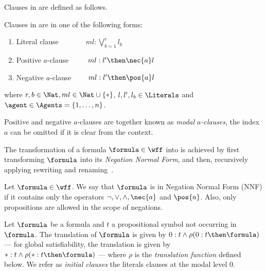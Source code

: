Clauses in  are defined as follows.

\begin{definition}
    Clauses in  are in one of the following forms:
    \begin{enumerate}
        \item Literal clause $\ \ \quad \qquad ml : \bigvee^r_{b=1} l_b$
        \item Positive $a$-clause $\ \qquad ml : l' \then \nec{a} l$
        \item Negative $a$-clause $\qquad ml : l' \then \pos{a} l$
    \end{enumerate}
    where $r, b \in \Nat, ml \in \Nat \cup \{*\}$, $l, l', l_b \in
    \Literals$ and $\agent \in \Agents = \{1, \ldots, n\}$.
\end{definition}

Positive and negative $a$-clauses are together known as \emph{modal
$a$-clauses}, the index $a$ can be omitted if it is clear from the context.

The transformation of a formula $\formula \in \wff$ into  is achieved
by first transforming $\formula$ into its \emph{Negation Normal Form}, and then,
recursively applying rewriting and renaming~\cite{plaisted1986structure}.

\begin{definition}
    Let $\formula \in \wff$. We say that $\formula$ is in Negation Normal Form (NNF) if
    it contains only the operators $\neg, \lor, \land, \nec{a}$ and $\pos{a}$. Also,
    only propositions are allowed in the scope of negations.
\end{definition}

Let $\formula$ be a formula and $t$ a propositional symbol not occurring in
$\formula$. The translation of $\formula$ is given by $0 : t \land \rho(0 : t
\then \formula)$ --- for global satisfiability, the translation is given by $* :
t \land \rho(* : t \then \formula)$ --- where $\rho$ is the \emph{translation
function} defined below. We refer as \emph{initial clauses} the literals clauses
at the modal level 0. 

